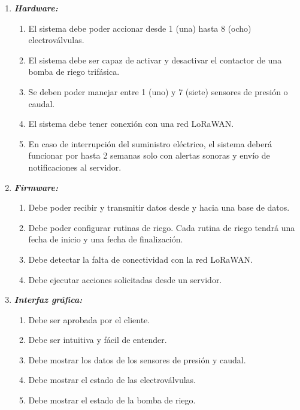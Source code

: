 \documentclass[11pt]{charter}
\begin{document}
\begin{enumerate}
	\item \textbf{\textit{Hardware:}}
	\begin{enumerate}
		\item El sistema debe poder accionar desde 1 (una) hasta 8 (ocho) 			  	electroválvulas.
		\item El sistema debe ser capaz de activar y desactivar el contactor de una bomba de riego trifásica.
		\item Se deben poder manejar entre 1 (uno) y 7 (siete) sensores de presión o caudal.
		\item El sistema debe tener conexión con una red LoRaWAN.
		\item En caso de interrupción del suministro eléctrico, el sistema deberá funcionar por hasta 2 semanas solo con alertas sonoras y envío de notificaciones al servidor.
	\end{enumerate}		
	
	\item \textbf{\textit{Firmware:}}
	\begin{enumerate}
		\item Debe poder recibir y transmitir datos desde y hacia una base de datos.
		\item Debe poder configurar rutinas de riego. Cada rutina de riego tendrá una fecha de inicio y una fecha de finalización.
		\item Debe detectar la falta de conectividad con la red LoRaWAN.
		\item Debe ejecutar acciones solicitadas desde un servidor. 
	\end{enumerate}
	
	\item \textbf{\textit{Interfaz gráfica:}}
	\begin{enumerate}
		\item Debe ser aprobada por el cliente.
		\item Debe ser intuitiva y fácil de entender.		
		\item Debe mostrar los datos de los sensores de presión y caudal.
		\item Debe mostrar el estado de las electroválvulas. 
		\item Debe mostrar el estado de la bomba de riego.
	\end{enumerate}

	
\end{enumerate}
\end{document}
